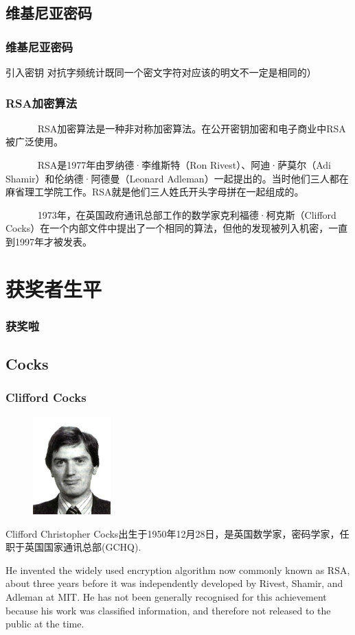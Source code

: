 \documentclass[slidestop,compress,mathserif]{beamer}
\begin{document}
\subsection{\hfill 维基尼亚密码}
\begin{frame}
  \frametitle{维基尼亚密码}
引入密钥 对抗字频统计既同一个密文字符对应该的明文不一定是相同的）
\end{frame}

\begin{frame}
  \frametitle{RSA加密算法}
~ ~ ~ ~ RSA加密算法是一种非对称加密算法。在公开密钥加密和电子商业中RSA被广泛使用。

~ ~ ~ ~ RSA是1977年由罗纳德·李维斯特（Ron Rivest）、阿迪·萨莫尔（Adi Shamir）和伦纳德·阿德曼（Leonard Adleman）一起提出的。当时他们三人都在麻省理工学院工作。RSA就是他们三人姓氏开头字母拼在一起组成的。

~ ~ ~ ~ 1973年，在英国政府通讯总部工作的数学家克利福德·柯克斯（Clifford Cocks）在一个内部文件中提出了一个相同的算法，但他的发现被列入机密，一直到1997年才被发表。

\end{frame}

\section{获奖者生平}

\begin{frame}
  \frametitle{获奖啦}

\end{frame}


\subsection{\hfill Cocks}
\begin{frame}
  \frametitle{Clifford Cocks}
  \begin{multicols}{2}
    \begin{figure}
      \includegraphics[width=3cm]{Cocks.jpg}
    \end{figure}
    Clifford Christopher Cocks出生于1950年12月28日，是英国数学家，密码学家，任职于英国国家通讯总部(GCHQ).
    
    He invented the widely used encryption algorithm now commonly known as RSA, about three years before it was independently developed by Rivest, Shamir, and Adleman at MIT. He has not been generally recognised for this achievement because his work was classified information, and therefore not released to the public at the time.

    
  \end{multicols}
  
\end{frame}
\end{document}
